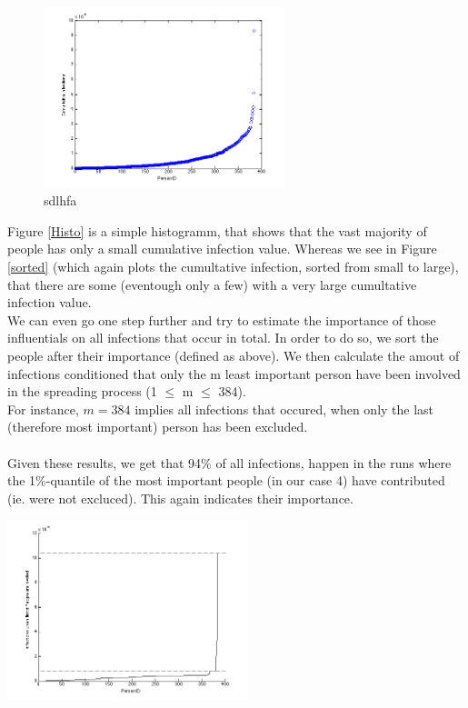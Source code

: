\begin{figure}[H!]
\includegraphics[width=7cm]{influ1}
\caption{sdlhfa}
\label{Sorted}
\end{figure}

Figure \ref{Histo} is a simple histogramm, that shows that the vast majority of people has only a small cumulative infection value. Whereas we see in Figure \ref{sorted} (which again plots the cumultative infection, sorted from small to large), that there are some (eventough only a few) with a very large cumultative infection value. \\

We can even go one step further and try to estimate the importance of those influentials on all infections that occur in total. In order to do so, we sort the people after their importance (defined as above). We then calculate the amout of infections conditioned that only the m least important person have been involved in the spreading process (1 $\le$ m $\le$ 384).\\
For instance, $m=384$ implies all infections that occured, when only the last (therefore most important) person has been excluded.\\
\\
Given these results, we get that 94\% of all infections, happen in the runs where the 1\%-quantile of the most important people (in our case 4) have contributed (ie. were not excluced). This again indicates their importance.

\includegraphics[width=7cm]{influ3}


